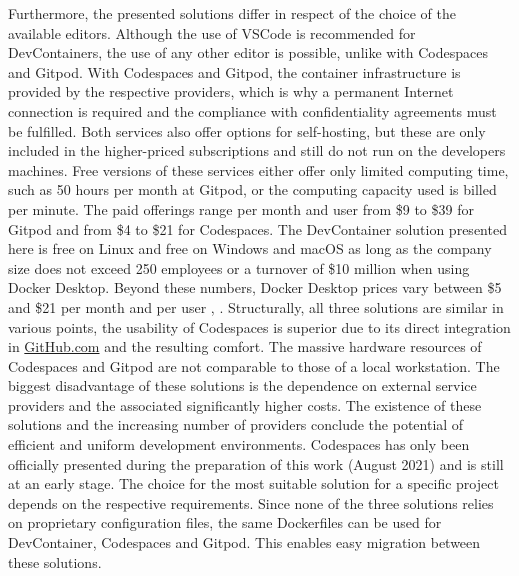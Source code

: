         Furthermore, the presented solutions differ in respect of the choice of the available editors. Although the use of \ac{VSCode} is recommended for DevContainers, the use of any other editor is possible, unlike with Codespaces and Gitpod. With Codespaces and Gitpod, the container infrastructure is provided by the respective providers, which is why a permanent Internet connection is required and the compliance with confidentiality agreements must be fulfilled. Both services also offer options for self-hosting, but these are only included in the higher-priced subscriptions and still do not run on the developers machines. Free versions of these services either offer only limited computing time, such as 50 hours per month at Gitpod, or the computing capacity used is billed per minute. The paid offerings range per month and user from \$9 to \$39 for Gitpod and from \$4 to \$21 for Codespaces. The DevContainer solution presented here is free on Linux and free on Windows and macOS as long as the company size does not exceed 250 employees or a turnover of \$10 million when using Docker Desktop. Beyond these numbers, Docker Desktop prices vary between \$5 and \$21 per month and per user \cite{gitpod}, \cite{githubblogcodespace}.\newline
        Structurally, all three solutions are similar in various points, the usability of Codespaces is superior due to its direct integration in \href{https://www.GitHub.com}{GitHub.com} and the resulting comfort. The massive hardware resources of Codespaces and Gitpod are not comparable to those of a local workstation. The biggest disadvantage of these solutions is the dependence on external service providers and the associated significantly higher costs. The existence of these solutions and the increasing number of providers conclude the potential of efficient and uniform development environments. Codespaces has only been officially presented during the preparation of this work (August 2021) and is still at an early stage.
        The choice for the most suitable solution for a specific project depends on the respective requirements. Since none of the three solutions relies on proprietary configuration files, the same Dockerfiles can be used for DevContainer, Codespaces and Gitpod. This enables easy migration between these solutions.


